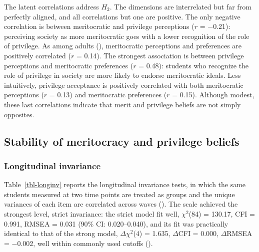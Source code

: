 \documentclass[
  11pt,
]{article}
\begin{document}
The latent correlations address \(H_2\). The dimensions are interrelated
but far from perfectly aligned, and all correlations but one are
positive. The only negative correlation is between meritocratic and
privilege perceptions (\(r\) = −0.21): perceiving society as more
meritocratic goes with a lower recognition of the role of privilege. As
among adults (), meritocratic perceptions and preferences are positively
correlated (\(r\) = 0.14). The strongest association is between
privilege perceptions and meritocratic preferences (\(r\) = 0.48):
students who recognize the role of privilege in society are more likely
to endorse meritocratic ideals. Less intuitively, privilege acceptance
is positively correlated with both meritocratic perceptions (\(r\) =
0.13) and meritocratic preferences (\(r\) = 0.15). Although modest,
these last correlations indicate that merit and privilege beliefs are
not simply opposites.

\subsection{Stability of meritocracy and privilege
beliefs}\label{stability-of-meritocracy-and-privilege-beliefs}

\subsubsection{Longitudinal invariance}\label{longitudinal-invariance}

Table~\ref{tbl-longinv} reports the longitudinal invariance tests, in
which the same students measured at two time points are treated as
groups and the unique variances of each item are correlated across waves
(). The scale
achieved the strongest level, strict invariance: the strict model fit
well, \(\chi^2\)(84) = 130.17, CFI = 0.991, RMSEA = 0.031 (90\% CI:
0.020--0.040), and its fit was practically identical to that of the
strong model, \(\Delta \chi^2\)(4) = 1.635, \(\Delta\)CFI = 0.000,
\(\Delta\)RMSEA = −0.002, well within commonly used cutoffs
().
\end{document}
